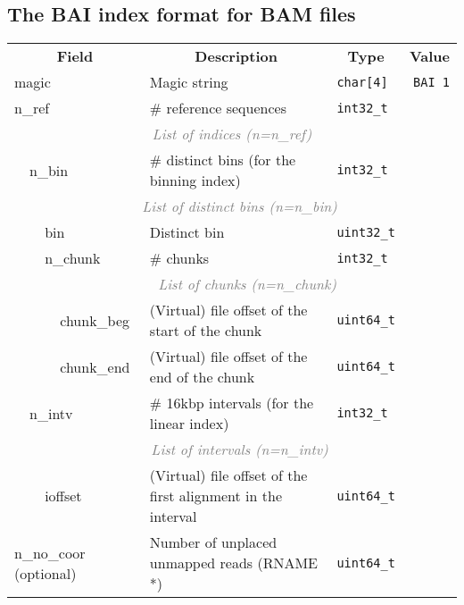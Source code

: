 \documentclass[10pt]{article}
\begin{document}
\subsection{The BAI index format for BAM files}
\begin{table}[ht]
{\small
\begin{tabular}{|l|l|l|l|l|l|r|}
  \cline{1-7}
  \multicolumn{4}{|c|}{\bf Field} & \multicolumn{1}{c|}{\bf Description} & \multicolumn{1}{c|}{\bf Type} & \multicolumn{1}{c|}{\bf Value} \\\cline{1-7}
  \multicolumn{4}{|l|}{\sf magic} & Magic string & {\tt char[4]} & {\tt BAI\char92 1}\\\cline{1-7}
  \multicolumn{4}{|l|}{\sf n\_ref} & \# reference sequences & {\tt int32\_t} & \\\cline{1-7}
  \multicolumn{7}{|c|}{\textcolor{gray}{\it List of indices (n=n\_ref)}} \\\cline{2-7}
  & \multicolumn{3}{l|}{\sf n\_bin} & \# distinct bins (for the binning index) & {\tt int32\_t} & \\\cline{2-7}
  & \multicolumn{6}{c|}{\textcolor{gray}{\it List of distinct bins (n=n\_bin)}} \\\cline{3-7}
  & & \multicolumn{2}{l|}{\sf bin} & Distinct bin & {\tt uint32\_t} & \\\cline{3-7}
  & & \multicolumn{2}{l|}{\sf n\_chunk} & \# chunks & {\tt int32\_t} & \\\cline{3-7}
  & & \multicolumn{5}{c|}{\textcolor{gray}{\it List of chunks (n=n\_chunk)}} \\\cline{4-7}
  & & & {\sf chunk\_beg} & (Virtual) file offset of the start of the chunk & {\tt uint64\_t} & \\\cline{4-7}
  & & & {\sf chunk\_end} & (Virtual) file offset of the end of the chunk & {\tt uint64\_t} & \\\cline{2-7}
  & \multicolumn{3}{l|}{\sf n\_intv} & \# 16kbp intervals (for the linear index) & {\tt int32\_t} & \\\cline{2-7}
  & \multicolumn{6}{c|}{\textcolor{gray}{\it List of intervals (n=n\_intv)}} \\\cline{3-7}
  & & \multicolumn{2}{l|}{\sf ioffset} & (Virtual) file offset of the first alignment in the interval & {\tt uint64\_t} & \\\cline{1-7}
  \multicolumn{4}{|l|}{{\sf n\_no\_coor} (optional)} & Number of unplaced unmapped reads ({\sf RNAME} *) & {\tt uint64\_t} & \\\cline{1-7}
\end{tabular}}
\end{table}
\end{document}
